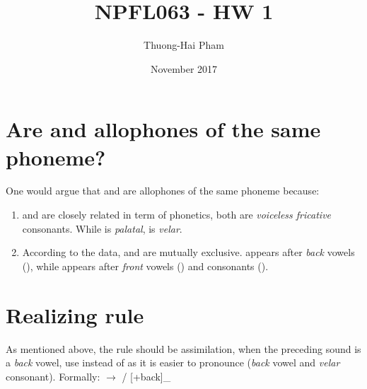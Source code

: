 \documentclass{article}
\title{NPFL063 - HW 1}
\author{Thuong-Hai Pham}
\date{November 2017}
\begin{document}
\maketitle

\section{Are \textipa{[\c{c}]} and \textipa{[x]} allophones of the same phoneme?}

One would argue that \textipa{[\c{c}]} and \textipa{[x]} are allophones of the same phoneme because:
\begin{enumerate}
    \item \textipa{[\c{c}]} and \textipa{[x]} are closely related in term of phonetics, both are \textit{voiceless fricative} consonants. While \textipa{[\c{c}]} is \textit{palatal}, \textipa{[x]} is \textit{velar}.
    \item According to the data, \textipa{[\c{c}]} and \textipa{[x]} are mutually exclusive. \textipa{[x]} appears after \textit{back} vowels (\textipa{[A,u,o,o:]}), while \textipa{[\c{c}]} appears after \textit{front} vowels (\textipa{[i,e,E]}) and consonants (\textipa{[d,l]}).
\end{enumerate}

\section{Realizing rule}

As mentioned above, the rule should be assimilation, when the preceding sound is a \textit{back} vowel, use \textipa{[x]} instead of \textipa{[\c{c}]} as it is easier to pronounce (\textit{back} vowel and \textit{velar} consonant). Formally:  $\rightarrow$ \textipa{[x]} / [+back]\_
\end{document}
